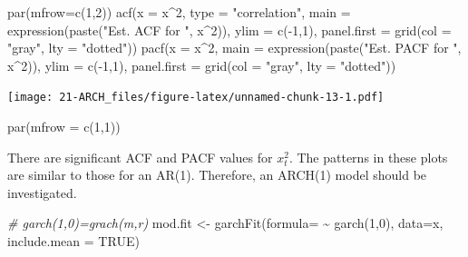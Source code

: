 \documentclass[
]{book}
\newenvironment{Shaded}{\begin{snugshade}}{\end{snugshade}}
\newcommand{\AttributeTok}[1]{\textcolor[rgb]{0.77,0.63,0.00}{#1}}
\newcommand{\CommentTok}[1]{\textcolor[rgb]{0.56,0.35,0.01}{\textit{#1}}}
\newcommand{\ConstantTok}[1]{\textcolor[rgb]{0.00,0.00,0.00}{#1}}
\newcommand{\DecValTok}[1]{\textcolor[rgb]{0.00,0.00,0.81}{#1}}
\newcommand{\FunctionTok}[1]{\textcolor[rgb]{0.00,0.00,0.00}{#1}}
\newcommand{\NormalTok}[1]{#1}
\newcommand{\OtherTok}[1]{\textcolor[rgb]{0.56,0.35,0.01}{#1}}
\newcommand{\SpecialCharTok}[1]{\textcolor[rgb]{0.00,0.00,0.00}{#1}}
\newcommand{\StringTok}[1]{\textcolor[rgb]{0.31,0.60,0.02}{#1}}
\theoremstyle{definition}
\theoremstyle{definition}
\theoremstyle{definition}
\theoremstyle{definition}
\theoremstyle{remark}
\begin{document}
\begin{Shaded}
\begin{Highlighting}[]
\FunctionTok{par}\NormalTok{(}\AttributeTok{mfrow=}\FunctionTok{c}\NormalTok{(}\DecValTok{1}\NormalTok{,}\DecValTok{2}\NormalTok{))}
\FunctionTok{acf}\NormalTok{(}\AttributeTok{x =}\NormalTok{ x}\SpecialCharTok{\^{}}\DecValTok{2}\NormalTok{, }\AttributeTok{type =} \StringTok{"correlation"}\NormalTok{, }\AttributeTok{main =} 
    \FunctionTok{expression}\NormalTok{(}\FunctionTok{paste}\NormalTok{(}\StringTok{"Est. ACF for "}\NormalTok{, x}\SpecialCharTok{\^{}}\DecValTok{2}\NormalTok{)), }\AttributeTok{ylim =} 
    \FunctionTok{c}\NormalTok{(}\SpecialCharTok{{-}}\DecValTok{1}\NormalTok{,}\DecValTok{1}\NormalTok{), }\AttributeTok{panel.first =} \FunctionTok{grid}\NormalTok{(}\AttributeTok{col =} \StringTok{"gray"}\NormalTok{, }\AttributeTok{lty =} 
    \StringTok{"dotted"}\NormalTok{))}
\FunctionTok{pacf}\NormalTok{(}\AttributeTok{x =}\NormalTok{ x}\SpecialCharTok{\^{}}\DecValTok{2}\NormalTok{, }\AttributeTok{main =} \FunctionTok{expression}\NormalTok{(}\FunctionTok{paste}\NormalTok{(}\StringTok{"Est. PACF for "}\NormalTok{, }
\NormalTok{    x}\SpecialCharTok{\^{}}\DecValTok{2}\NormalTok{)), }\AttributeTok{ylim =} \FunctionTok{c}\NormalTok{(}\SpecialCharTok{{-}}\DecValTok{1}\NormalTok{,}\DecValTok{1}\NormalTok{), }\AttributeTok{panel.first =} \FunctionTok{grid}\NormalTok{(}\AttributeTok{col =} 
    \StringTok{"gray"}\NormalTok{, }\AttributeTok{lty =} \StringTok{"dotted"}\NormalTok{))}
\end{Highlighting}
\end{Shaded}

\texttt{[image: 21-ARCH\_files/figure-latex/unnamed-chunk-13-1.pdf]}

\begin{Shaded}
\begin{Highlighting}[]
\FunctionTok{par}\NormalTok{(}\AttributeTok{mfrow =} \FunctionTok{c}\NormalTok{(}\DecValTok{1}\NormalTok{,}\DecValTok{1}\NormalTok{))}
\end{Highlighting}
\end{Shaded}

There are significant ACF and PACF values for \(x_t^2\). The patterns in these plots are similar to those for an AR(1). Therefore, an ARCH(1) model should be investigated.

\begin{Shaded}
\begin{Highlighting}[]
\CommentTok{\# garch(1,0)=grach(m,r)}
\NormalTok{mod.fit }\OtherTok{\textless{}{-}} \FunctionTok{garchFit}\NormalTok{(}\AttributeTok{formula=} \SpecialCharTok{\textasciitilde{}} \FunctionTok{garch}\NormalTok{(}\DecValTok{1}\NormalTok{,}\DecValTok{0}\NormalTok{), }\AttributeTok{data=}\NormalTok{x, }\AttributeTok{include.mean =} \ConstantTok{TRUE}\NormalTok{)}
\end{Highlighting}
\end{Shaded}
\end{document}
